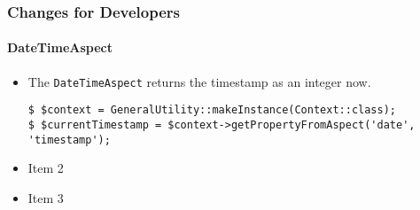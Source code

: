 %

\begin{frame}[fragile]
	\frametitle{Changes for Developers}
	\framesubtitle{DateTimeAspect}

	\begin{itemize}
		\item The \texttt{DateTimeAspect} returns the timestamp as an integer now.
		\begin{lstlisting}
$ $context = GeneralUtility::makeInstance(Context::class);
$ $currentTimestamp = $context->getPropertyFromAspect('date', 'timestamp');
		\end{lstlisting}

		\item Item 2
		\item Item 3
	\end{itemize}

\end{frame}

